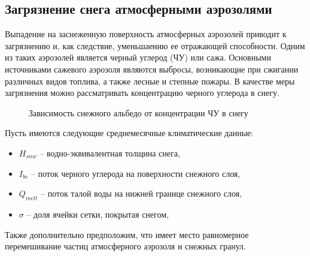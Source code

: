 \documentclass[a4paper, fontsize=14pt]{scrartcl}
\begin{document}
\subsection{Загрязнение снега атмосферными аэрозолями}

Выпадение на заснеженную поверхность атмосферных аэрозолей приводит к загрязнению и, как следствие,  уменьшаению ее отражающей способности. Одним из таких аэрозолей является черный углерод (ЧУ) или сажа. Основными источниками сажевого аэрозоля являются выбросы, возникающие при сжигании различных видов топлива, а также лесные и степные пожары. В качестве меры загрязнения можно рассматривать концентрацию черного углерода в снегу.

\begin{figure}[h]
    \caption{Зависимость снежного альбедо от концентрации ЧУ в снегу}
    \label{fig:image}
\end{figure}

Пусть имеются следующие среднемесячные климатические данные:
\begin{itemize}
    \item $H_{snw}$ -- водно-эквивалентная толщина снега, 
    \item $I_{bc}$ -- поток черного углерода на поверхности снежного слоя, 
    \item $Q_{melt}$ -- поток талой воды на нижней границе снежного слоя,
    \item $\sigma$ -- доля ячейки сетки, покрытая снегом,
\end{itemize} 

\newpage
Также дополнительно предположим, что имеет место равномерное перемешивание частиц атмосферного аэрозоля и снежных гранул.
\end{document}
